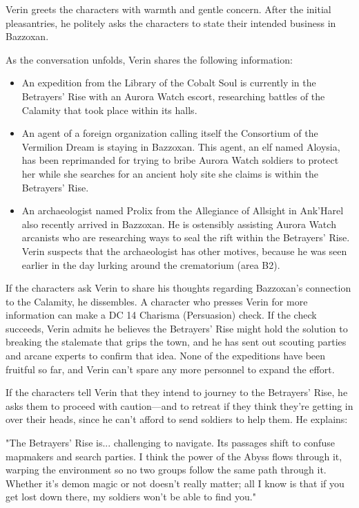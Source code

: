 \documentclass[10pt,a4paper,twoside,bg=print,twocolumn,openany,nodeprecatedcode]{dndbook}
\begin{document}
Verin greets the characters with warmth and gentle concern. After the initial pleasantries, he politely asks the characters to state their intended business in Bazzoxan.

As the conversation unfolds, Verin shares the following information:


\begin{itemize}
\item An expedition from the Library of the Cobalt Soul is currently in the Betrayers' Rise with an Aurora Watch escort, researching battles of the Calamity that took place within its halls.
\item An agent of a foreign organization calling itself the Consortium of the Vermilion Dream is staying in Bazzoxan. This agent, an elf named Aloysia, has been reprimanded for trying to bribe Aurora Watch soldiers to protect her while she searches for an ancient holy site she claims is within the Betrayers' Rise.
\item An archaeologist named Prolix from the Allegiance of Allsight in Ank'Harel also recently arrived in Bazzoxan. He is ostensibly assisting Aurora Watch arcanists who are researching ways to seal the rift within the Betrayers' Rise. Verin suspects that the archaeologist has other motives, because he was seen earlier in the day lurking around the crematorium (area B2).
\end{itemize}

If the characters ask Verin to share his thoughts regarding Bazzoxan's connection to the Calamity, he dissembles. A character who presses Verin for more information can make a DC 14 Charisma (Persuasion) check. If the check succeeds, Verin admits he believes the Betrayers' Rise might hold the solution to breaking the stalemate that grips the town, and he has sent out scouting parties and arcane experts to confirm that idea. None of the expeditions have been fruitful so far, and Verin can't spare any more personnel to expand the effort.

If the characters tell Verin that they intend to journey to the Betrayers' Rise, he asks them to proceed with caution—and to retreat if they think they're getting in over their heads, since he can't afford to send soldiers to help them. He explains:

\begin{DndReadAloud}{}
"The Betrayers' Rise is... challenging to navigate. Its passages shift to confuse mapmakers and search parties. I think the power of the Abyss flows through it, warping the environment so no two groups follow the same path through it. Whether it's demon magic or not doesn't really matter; all I know is that if you get lost down there, my soldiers won't be able to find you."

\end{DndReadAloud}
\end{document}
